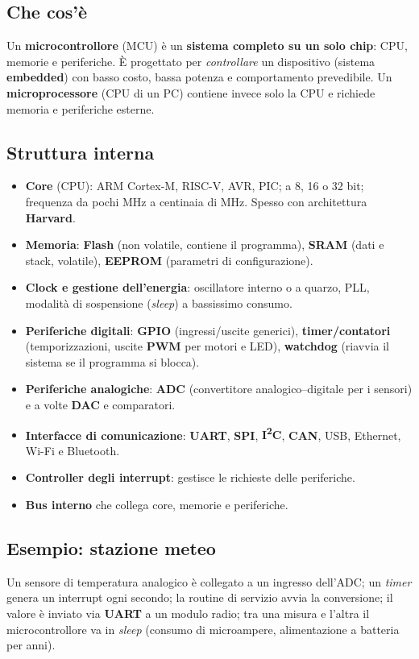 \subsection{Che cos'è}
Un \textbf{microcontrollore} (MCU) è un \textbf{sistema completo su un solo chip}: CPU, memorie e periferiche. È progettato per \emph{controllare} un dispositivo (sistema \textbf{embedded}) con basso costo, bassa potenza e comportamento prevedibile. Un \textbf{microprocessore} (CPU di un PC) contiene invece solo la CPU e richiede memoria e periferiche esterne.

\subsection{Struttura interna}
\begin{itemize}
    \item \textbf{Core} (CPU): ARM Cortex-M, RISC-V, AVR, PIC; a 8, 16 o 32 bit; frequenza da pochi MHz a centinaia di MHz. Spesso con architettura \textbf{Harvard}.
    \item \textbf{Memoria}: \textbf{Flash} (non volatile, contiene il programma), \textbf{SRAM} (dati e stack, volatile), \textbf{EEPROM} (parametri di configurazione).
    \item \textbf{Clock e gestione dell'energia}: oscillatore interno o a quarzo, PLL, modalità di sospensione (\emph{sleep}) a bassissimo consumo.
    \item \textbf{Periferiche digitali}: \textbf{GPIO} (ingressi/uscite generici), \textbf{timer/contatori} (temporizzazioni, uscite \textbf{PWM} per motori e LED), \textbf{watchdog} (riavvia il sistema se il programma si blocca).
    \item \textbf{Periferiche analogiche}: \textbf{ADC} (convertitore analogico--digitale per i sensori) e a volte \textbf{DAC} e comparatori.
    \item \textbf{Interfacce di comunicazione}: \textbf{UART}, \textbf{SPI}, \textbf{I\textsuperscript{2}C}, \textbf{CAN}, USB, Ethernet, Wi-Fi e Bluetooth.
    \item \textbf{Controller degli interrupt}: gestisce le richieste delle periferiche.
    \item \textbf{Bus interno} che collega core, memorie e periferiche.
\end{itemize}

\subsection{Esempio: stazione meteo}
Un sensore di temperatura analogico è collegato a un ingresso dell'ADC; un \emph{timer} genera un interrupt ogni secondo; la routine di servizio avvia la conversione; il valore è inviato via \textbf{UART} a un modulo radio; tra una misura e l'altra il microcontrollore va in \emph{sleep} (consumo di microampere, alimentazione a batteria per anni).

